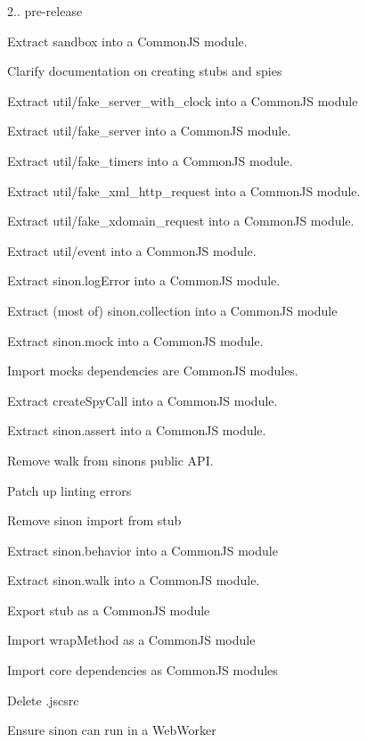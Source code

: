 \begin{DoxyItemize}
\item 2.. pre-\/release
\item Extract {\ttfamily sandbox} into a Common\+JS module.
\item Clarify documentation on creating stubs and spies
\item Extract {\ttfamily util/fake\+\_\+server\+\_\+with\+\_\+clock} into a Common\+JS module
\item Extract {\ttfamily util/fake\+\_\+server} into a Common\+JS module.
\item Extract {\ttfamily util/fake\+\_\+timers} into a Common\+JS module.
\item Extract {\ttfamily util/fake\+\_\+xml\+\_\+http\+\_\+request} into a Common\+JS module.
\item Extract {\ttfamily util/fake\+\_\+xdomain\+\_\+request} into a Common\+JS module.
\item Extract {\ttfamily util/event} into a Common\+JS module.
\item Extract {\ttfamily sinon.\+log\+Error} into a Common\+JS module.
\item Extract (most of) sinon.\+collection into a Common\+JS module
\item Extract {\ttfamily sinon.\+mock} into a Common\+JS module.
\item Import mock\textquotesingle{}s dependencies are Common\+JS modules.
\item Extract {\ttfamily create\+Spy\+Call} into a Common\+JS module.
\item Extract {\ttfamily sinon.\+assert} into a Common\+JS module.
\item Remove {\ttfamily walk} from sinon\textquotesingle{}s public A\+PI.
\item Patch up linting errors
\item Remove {\ttfamily sinon} import from stub
\item Extract {\ttfamily sinon.\+behavior} into a Common\+JS module
\item Extract {\ttfamily sinon.\+walk} into a Common\+JS module.
\item Export stub as a Common\+JS module
\item Import {\ttfamily wrap\+Method} as a Common\+JS module
\item Import core dependencies as Common\+JS modules
\item Delete .jscsrc
\item Ensure sinon can run in a Web\+Worker

\end{DoxyItemize}
